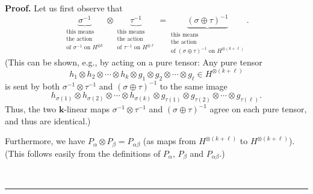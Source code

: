 \documentclass[numbers=enddot,12pt,final,onecolumn,notitlepage]{scrartcl}%
\theoremstyle{definition}
\newenvironment{proof}[1][Proof]{\noindent\textbf{#1.} }{\ \rule{0.5em}{0.5em}}
\begin{document}
\begin{proof}
Let us first observe that
\[
\underbrace{\sigma^{-1}}_{\substack{\text{this means}\\\text{the
action}\\\text{of }\sigma^{-1}\text{ on }H^{\otimes k}}}\otimes
\underbrace{\tau^{-1}}_{\substack{\text{this means}\\\text{the action}%
\\\text{of }\tau^{-1}\text{ on }H^{\otimes\ell}}}=\underbrace{\left(
\sigma\oplus\tau\right)  ^{-1}}_{\substack{\text{this means}\\\text{the
action}\\\text{of }\left(  \sigma\oplus\tau\right)  ^{-1}\text{ on }%
H^{\otimes\left(  k+\ell\right)  }}}.
\]
(This can be shown, e.g., by acting on a pure tensor: Any pure tensor
\[
h_{1}\otimes h_{2}\otimes\cdots\otimes h_{k}\otimes g_{1}\otimes g_{2}%
\otimes\cdots\otimes g_{\ell}\in H^{\otimes\left(  k+\ell\right)  }%
\]
is sent by both $\sigma^{-1}\otimes\tau^{-1}$ and $\left(  \sigma\oplus
\tau\right)  ^{-1}$ to the same image
\[
h_{\sigma\left(  1\right)  }\otimes h_{\sigma\left(  2\right)  }\otimes
\cdots\otimes h_{\sigma\left(  k\right)  }\otimes g_{\tau\left(  1\right)
}\otimes g_{\tau\left(  2\right)  }\otimes\cdots\otimes g_{\tau\left(
\ell\right)  }.
\]
Thus, the two $\mathbf{k}$-linear maps $\sigma^{-1}\otimes\tau^{-1}$ and
$\left(  \sigma\oplus\tau\right)  ^{-1}$ agree on each pure tensor, and thus
are identical.)

Furthermore, we have $P_{\alpha}\otimes P_{\beta}=P_{\alpha\beta}$ (as maps
from $H^{\otimes\left(  k+\ell\right)  }$ to $H^{\otimes\left(  k+\ell\right)
}$). (This follows easily from the definitions of $P_{\alpha}$, $P_{\beta}$
and $P_{\alpha\beta}$.)


\end{proof}
\end{document}

